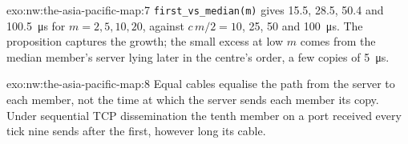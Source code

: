 \begin{solution}{exo:nw:the-asia-pacific-map:7}
\texttt{first\_vs\_median(m)} gives 15.5, 28.5, 50.4 and \qty{100.5}{\micro\second} for $m = 2, 5, 10, 20$, against $c\,m/2 = 10$, 25, 50 and
\qty{100}{\micro\second}. The proposition captures the growth; the small excess at low $m$ comes from the median member's server lying later in
the centre's order, a few copies of \qty{5}{\micro\second}.
\end{solution}

\begin{solution}{exo:nw:the-asia-pacific-map:8}
Equal cables equalise the path from the server to each member, not the time at which the server sends each member its copy. Under sequential
TCP dissemination the tenth member on a port received every tick nine sends after the first, however long its cable.
\end{solution}

